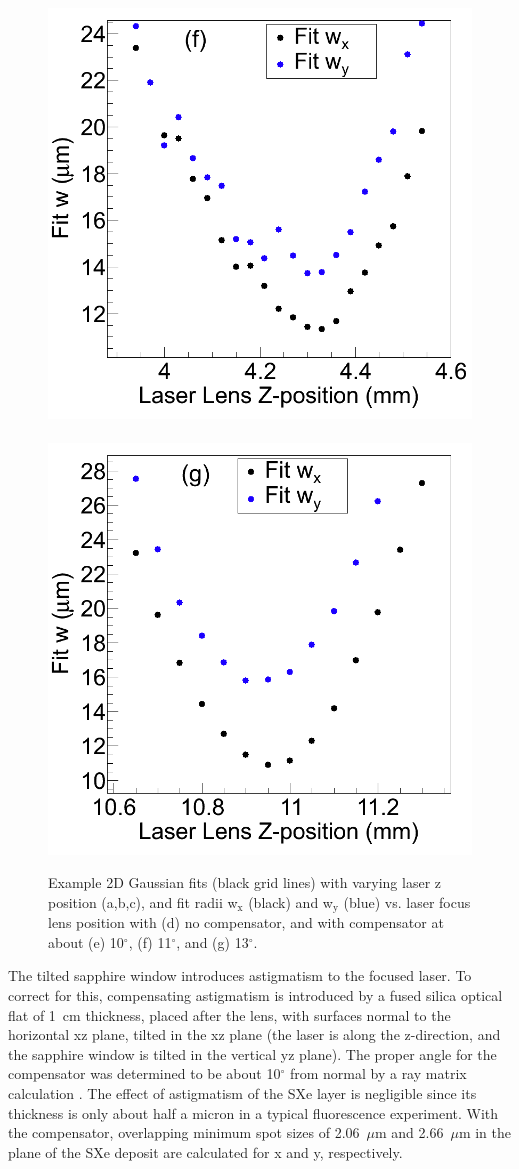 \begin{figure}
                \includegraphics[width=.45\textwidth]{figures/astigcorr_curve_corr_9-16.png}
                ~
                \includegraphics[width=.45\textwidth]{figures/astigcorr_curve_corr_13deg.png}
                \caption{Example 2D Gaussian fits (black grid lines) with varying laser z position (a,b,c), and fit radii  w$_{\text{x}}$ (black) and  w$_{\text{y}}$ (blue) vs. laser focus lens position with (d) no compensator, and with compensator at about (e) 10$^{\circ}$, (f) 11$^{\circ}$, and (g) 13$^{\circ}$.}
\label{fig:astig}
\end{figure}	

The tilted sapphire window introduces astigmatism to the focused laser.  To correct for this, compensating astigmatism is introduced by a fused silica optical flat of 1~cm thickness, placed after the lens, with surfaces normal to the horizontal xz plane, tilted in the xz plane (the laser is along the z-direction, and the sapphire window is tilted in the vertical yz plane).  The proper angle for the compensator was determined to be about 10$^{\circ}$ from normal by a ray matrix calculation \cite{raymatrix}.  The effect of astigmatism of the SXe layer is negligible since its thickness is only about half a micron in a typical fluorescence experiment.  With the compensator, overlapping minimum spot sizes of 2.06~$\mu$m and 2.66~$\mu$m in the plane of the SXe deposit are calculated for x and y, respectively.

